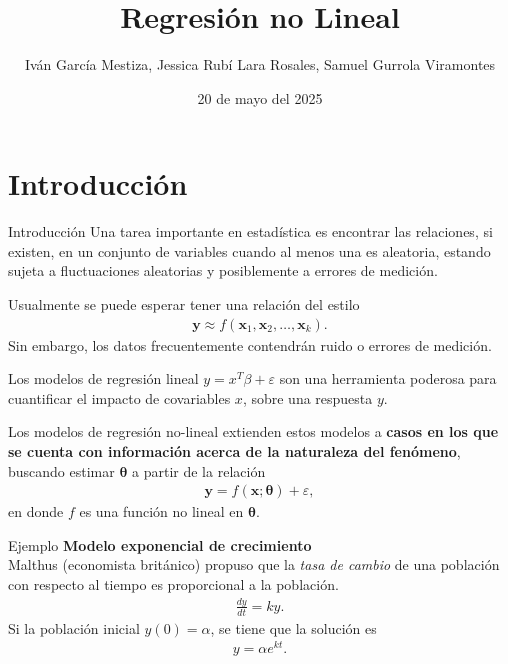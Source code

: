 \documentclass[aspectratio = 169, spanish]{beamer}
\title[CIMAT 2025]{Regresión no Lineal}
\author[Iván, Rubí, Samuel]{Iván García Mestiza, Jessica Rubí Lara Rosales, Samuel Gurrola Viramontes}
\institute[CIMAT ]{CIMAT}
\date{20 de mayo del 2025}
\begin{document}
\maketitle

\begin{frame}

\tableofcontents

\end{frame}


\section{Introducción}

\begin{frame}{Introducción}
Una tarea importante en estadística es encontrar las relaciones, si existen, en un conjunto de variables cuando al menos una es aleatoria, estando sujeta a fluctuaciones aleatorias y posiblemente a errores de medición.

Usualmente se puede esperar tener una relación del estilo
\begin{align*}
    \bm{y} \approx f(\bm{x}_{1}, \bm{x}_{2}, \ldots, \bm{x}_{k}).
\end{align*}
Sin embargo, los datos frecuentemente contendrán ruido o errores de medición.

\end{frame}

\begin{frame}
    Los modelos de regresión lineal $y = x^T \beta + \varepsilon$ son una herramienta poderosa para cuantificar el impacto de covariables $x$, sobre una respuesta $y$. 
    
    Los modelos de regresión no-lineal extienden estos modelos a \textbf{casos en los que se cuenta con información acerca de la naturaleza del fenómeno}, buscando estimar $\boldsymbol{\theta}$ a partir de la relación
    \begin{align*}
        \boldsymbol{y} = f(\boldsymbol{x}; \boldsymbol{\theta}) + \varepsilon,
    \end{align*}
    en donde $f$ es una función no lineal en $\boldsymbol{\theta}$.
\end{frame}

\begin{frame}{Ejemplo}
\textbf{Modelo exponencial de crecimiento}\\
\vspace{0.5cm}
   Malthus (economista británico) propuso que la \textit{tasa de cambio} de una población con respecto al tiempo es proporcional a la población.
\begin{align*}
    \frac{dy}{dt} = ky.
\end{align*}
Si la población inicial $y(0) = \alpha$, se tiene que la solución es
\begin{align*}
    y = \alpha e^{kt}.
\end{align*}
\end{frame}
\end{document}
